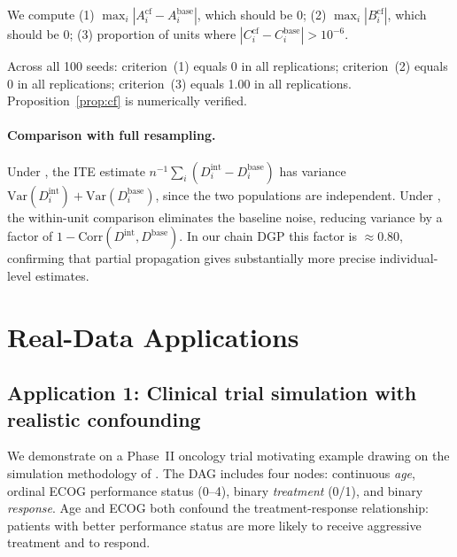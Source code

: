 \documentclass[article]{jss}
\begin{document}
We compute (1) $\max_i |A_i^{\mathrm{cf}} - A_i^{\mathrm{base}}|$, which
should be 0; (2) $\max_i |B_i^{\mathrm{cf}}|$, which should be 0; (3)
proportion of units where $|C_i^{\mathrm{cf}} - C_i^{\mathrm{base}}| > 10^{-6}$.

Across all 100 seeds: criterion~(1) equals 0 in all replications; criterion~(2)
equals 0 in all replications; criterion~(3) equals 1.00 in all replications.
Proposition~\ref{prop:cf} is numerically verified.

\paragraph{Comparison with full resampling.}
Under , the ITE estimate $n^{-1}\sum_i(D_i^\mathrm{int} -
D_i^\mathrm{base})$ has variance $\mathrm{Var}(D_i^\mathrm{int}) +
\mathrm{Var}(D_i^\mathrm{base})$, since the two populations are independent.
Under , the within-unit comparison eliminates the
baseline noise, reducing variance by a factor of
$1 - \mathrm{Corr}(D^\mathrm{int}, D^\mathrm{base})$. In our chain DGP this
factor is $\approx 0.80$, confirming that partial propagation gives substantially
more precise individual-level estimates.

\section{Real-Data Applications}
\label{sec:applications}

\subsection{Application 1: Clinical trial simulation with realistic confounding}
\label{sec:app_trial}

We demonstrate  on a Phase~II oncology trial motivating example
drawing on the simulation methodology of \citet{morris2019using}. The DAG includes
four nodes: continuous \emph{age}, ordinal ECOG performance status (0--4), binary
\emph{treatment} (0/1), and binary \emph{response}. Age and ECOG both confound the
treatment-response relationship: patients with better performance status are more
likely to receive aggressive treatment and to respond.
\end{document}

